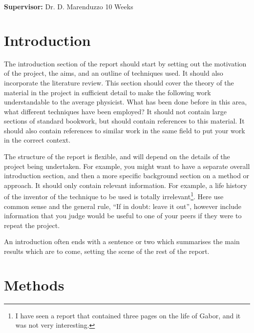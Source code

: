 \documentclass[a4paper,12pt]{article}
\begin{document}
\vfill
{\bf Supervisor:} Dr. D. Marenduzzo                 %
\hfill
10 Weeks                                         %
\newpage
%
\pagestyle{plain}                               %
\setcounter{page}{1}                            %
\tableofcontents                                %
\section{Introduction}

The introduction section of the report should start by setting out the
motivation of the project, the aims, and an outline of techniques used.
It should also incorporate the literature review. This section should 
cover the theory of the material in the project in sufficient detail to 
make the following work understandable to the average physicist. What has 
been done before in this area, what different techniques have been 
employed? It should not contain large sections of standard
bookwork, but should contain references to this material. It should also 
contain references to similar work in the same field to put your work in 
the correct context.

The structure of the report is flexible, and will depend on the details
of the project being undertaken. For example, you might want to have a 
separate overall introduction section, and then a more specific background section 
on a method or approach. It should only contain relevant information. For example, 
a life history of the inventor of the technique to be used is
totally irrelevant\footnote{I have seen a report that contained three pages
on the life of Gabor, and it was not very interesting.}. Here use common sense
and the general rule, ``If in doubt: leave it out'', however
include information that you judge would be useful to one of your
peers if they were to repeat the project.

An introduction often ends with a sentence or two which summarises the main
results which are to come, setting the scene of the rest of the report. 




\section{Methods}
\end{document}
